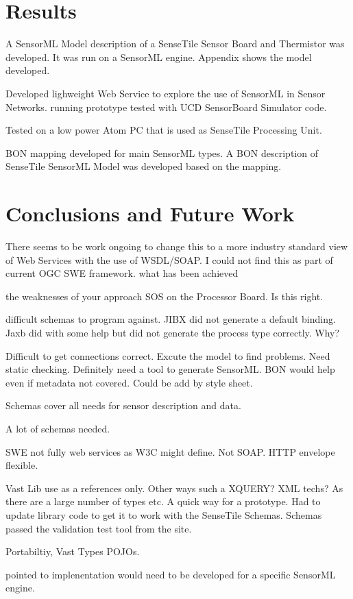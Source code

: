 \documentclass[]{final_report}
\begin{document}
\chapter{Results}

A  SensorML Model description of a SenseTile Sensor Board and Thermistor was developed. It was
run on a SensorML engine. Appendix shows the model developed.

Developed lighweight Web Service to explore the use of SensorML in Sensor Networks.
running prototype tested with UCD SensorBoard Simulator code.

Tested on a low power Atom PC that is used as SenseTile Processing Unit.

BON mapping developed for main SensorML types. A BON description of SenseTile SensorML Model
was developed based on the mapping.

\chapter{ Conclusions and Future Work}
There seems to be work ongoing to change this to a more industry standard view of Web Services with the use of WSDL/SOAP. I could not find this as part of current OGC SWE framework.
what has been achieved

the weaknesses of your approach
SOS on the Processor Board. Is this right.

difficult schemas to program against.
JIBX did not generate a default binding.
Jaxb did with some help but did not generate the process type correctly.
Why?

Difficult to get connections correct. Excute the model to find problems.
Need static checking.
Definitely need a tool to generate SensorML. BON would
help even if metadata not covered. Could be add by
style sheet.

Schemas cover all needs for sensor description and data.

A lot of schemas needed.

SWE not fully web services as W3C might define. Not SOAP. HTTP envelope
flexible.

Vast Lib use as a references only. Other ways such a XQUERY? XML techs?
As there are a large number of types etc. A quick way for a prototype.
Had to update library code to get it to work with the SenseTile Schemas. Schemas
passed the validation test tool from the site.

Portabiltiy, Vast Types POJOs.

pointed to implenentation would need to be developed for a specific
SensorML engine.
\end{document}
